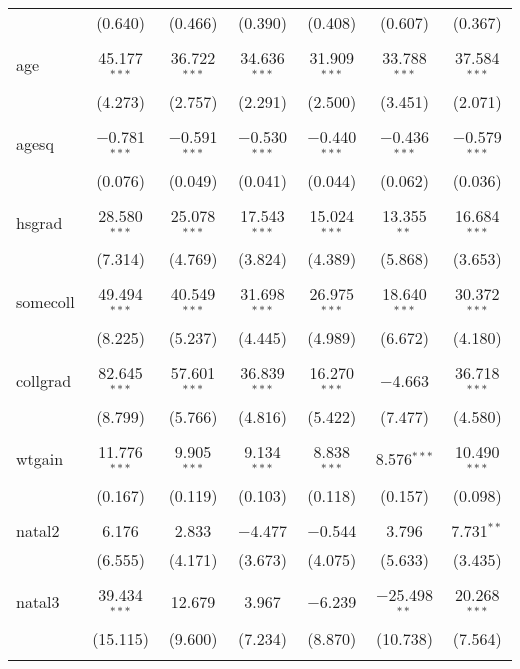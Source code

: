 \begin{table}[!htbp]
\begin{tabular}{@{\extracolsep{5pt}}lcccccc}
  & (0.640) & (0.466) & (0.390) & (0.408) & (0.607) & (0.367) \\ 
  & & & & & & \\ 
 age & 45.177$^{***}$ & 36.722$^{***}$ & 34.636$^{***}$ & 31.909$^{***}$ & 33.788$^{***}$ & 37.584$^{***}$ \\ 
  & (4.273) & (2.757) & (2.291) & (2.500) & (3.451) & (2.071) \\ 
  & & & & & & \\ 
 agesq & $-$0.781$^{***}$ & $-$0.591$^{***}$ & $-$0.530$^{***}$ & $-$0.440$^{***}$ & $-$0.436$^{***}$ & $-$0.579$^{***}$ \\ 
  & (0.076) & (0.049) & (0.041) & (0.044) & (0.062) & (0.036) \\ 
  & & & & & & \\ 
 hsgrad & 28.580$^{***}$ & 25.078$^{***}$ & 17.543$^{***}$ & 15.024$^{***}$ & 13.355$^{**}$ & 16.684$^{***}$ \\ 
  & (7.314) & (4.769) & (3.824) & (4.389) & (5.868) & (3.653) \\ 
  & & & & & & \\ 
 somecoll & 49.494$^{***}$ & 40.549$^{***}$ & 31.698$^{***}$ & 26.975$^{***}$ & 18.640$^{***}$ & 30.372$^{***}$ \\ 
  & (8.225) & (5.237) & (4.445) & (4.989) & (6.672) & (4.180) \\ 
  & & & & & & \\ 
 collgrad & 82.645$^{***}$ & 57.601$^{***}$ & 36.839$^{***}$ & 16.270$^{***}$ & $-$4.663 & 36.718$^{***}$ \\ 
  & (8.799) & (5.766) & (4.816) & (5.422) & (7.477) & (4.580) \\ 
  & & & & & & \\ 
 wtgain & 11.776$^{***}$ & 9.905$^{***}$ & 9.134$^{***}$ & 8.838$^{***}$ & 8.576$^{***}$ & 10.490$^{***}$ \\ 
  & (0.167) & (0.119) & (0.103) & (0.118) & (0.157) & (0.098) \\ 
  & & & & & & \\ 
 natal2 & 6.176 & 2.833 & $-$4.477 & $-$0.544 & 3.796 & 7.731$^{**}$ \\ 
  & (6.555) & (4.171) & (3.673) & (4.075) & (5.633) & (3.435) \\ 
  & & & & & & \\ 
 natal3 & 39.434$^{***}$ & 12.679 & 3.967 & $-$6.239 & $-$25.498$^{**}$ & 20.268$^{***}$ \\ 
  & (15.115) & (9.600) & (7.234) & (8.870) & (10.738) & (7.564) \\ 
  & & & & & & \\ 

\end{tabular}
\end{table}
